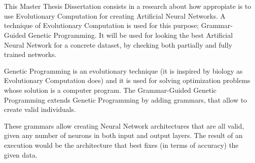 \documentclass[spanish,a4paper,12pt,twoside]{report}
\begin{document}
  \chapter{\vspace{-3cm}{\LARGE Summary}}
  \vspace{-1cm}
  This Master Thesis Dissertation consists in a research about how appropiate is to use Evolutionary Computation for creating Artificial Neural Networks. A technique of Evolutionary Computation is used for this purpose; Grammar-Guided Genetic Programming. It will be used for looking the best Artificial Neural Network for a concrete dataset, by checking both partially and fully trained networks. \par
  Genetic Programming is an evolutionary technique (it is inspired by biology as Evolutionary Computation does) and it is used for solving optimization problems whose solution is a computer program. The Grammar-Guided Genetic Programming extends Genetic Programming by adding grammars, that allow to create valid individuals. \par
  These grammars allow creating Neural Network architectures that are all valid, given any number of neurons in both input and output layers. The result of an execution would be the architecture that best fixes (in terms of accuracy) the given data.
  \vfill
  \newpage\cleardoublepage
  
  \newpage\cleardoublepage
  
\end{document}
